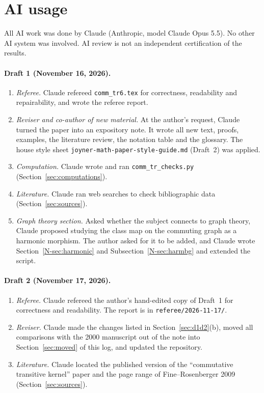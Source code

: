 \documentclass[12pt,letterpaper]{article}
\begin{document}
\section{AI usage}\label{sec:ai}

All AI work was done by Claude (Anthropic, model Claude Opus 5.5). No other
AI system was involved. AI review is not an independent certification of
the results.

\paragraph{Draft 1 (November 16, 2026).}
\begin{enumerate}[itemsep=1pt]
\item \emph{Referee.} Claude refereed \texttt{comm\_tr6.tex} for correctness,
  readability and repairability, and wrote the referee report.
\item \emph{Reviser and co-author of new material.} At the author's request,
  Claude turned the paper into an expository note. It wrote all new text,
  proofs, examples, the literature review, the notation table and the
  glossary. The house style sheet \texttt{joyner-math-paper-style-guide.md}
  (Draft~2) was applied.
\item \emph{Computation.} Claude wrote and ran \texttt{comm\_tr\_checks.py}
  (Section~\ref{sec:computations}).
\item \emph{Literature.} Claude ran web searches to check bibliographic data
  (Section~\ref{sec:sources}).
\item \emph{Graph theory section.} Asked whether the subject connects to
  graph theory, Claude proposed studying the class map on the commuting
  graph as a harmonic morphism. The author asked for it to be added, and
  Claude wrote Section~\ref{N-sec:harmonic} and Subsection~\ref{N-sec:harmbg}
  and extended the script.
\end{enumerate}

\paragraph{Draft 2 (November 17, 2026).}
\begin{enumerate}[itemsep=1pt]
\item \emph{Referee.} Claude refereed the author's hand-edited copy of
  Draft~1 for correctness and readability. The report is in
  \texttt{referee/2026-11-17/}.
\item \emph{Reviser.} Claude made the changes listed in
  Section~\ref{sec:d1d2}(b), moved all comparisons with the 2000 manuscript
  out of the note into Section~\ref{sec:moved} of this log, and updated the
  repository.
\item \emph{Literature.} Claude located the published version of the
  ``commutative transitive kernel'' paper and the page range of
  Fine--Rosenberger 2009 (Section~\ref{sec:sources}).
\end{enumerate}
\end{document}
